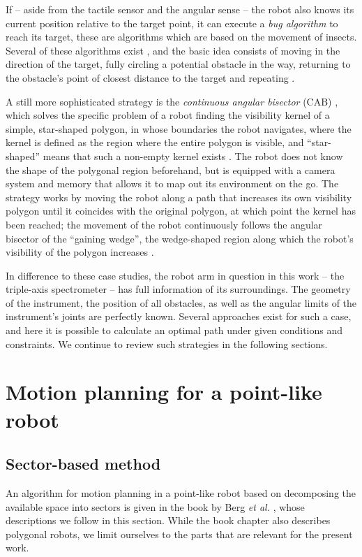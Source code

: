 If -- aside from the tactile sensor and the angular sense -- the robot also knows
its current position relative to the target point, it can execute a \textit{bug algorithm}
to reach its target, these are algorithms which are based on the movement of insects.
Several of these algorithms exist \cite{Choset2010_ch2}, and the basic idea consists
of moving in the direction of the target, fully circling a potential obstacle in the way,
returning to the obstacle's point of closest distance to the target and repeating
\cite[Ch. 7.3.1, pp. 323-326]{FUH_geo2020}.

A still more sophisticated strategy is the \textit{continuous angular bisector}
(CAB) \cite{Icking1995}, which solves the specific problem of a robot finding the visibility kernel
of a simple, star-shaped polygon, in whose boundaries the robot navigates, where the kernel is defined as the
region where the entire polygon is visible, and ``star-shaped'' means that such a
non-empty kernel exists \cite[Ch. 7.4.5, pp. 347-351]{FUH_geo2020}.
The robot does not know the shape of the polygonal region beforehand, but is equipped
with a camera system and memory that allows it to map out its environment on the go.
The strategy works by moving the robot along a path that increases its own visibility
polygon until it coincides with the original polygon, at which point the kernel has been
reached; the movement of the robot continuously follows the angular bisector of the
``gaining wedge'', the wedge-shaped region along which the robot's visibility of the
polygon increases \cite[p. 261]{Icking1995}.

In difference to these case studies, the robot arm in question in this work --
the triple-axis spectrometer -- has full information of its surroundings.
The geometry of the instrument, the position of all obstacles, as well
as the angular limits of the instrument's joints are perfectly known.
Several approaches exist for such a case, and here it is possible to calculate
an optimal path under given conditions and constraints.
We continue to review such strategies in the following sections.



\section{Motion planning for a point-like robot}
\label{sec:pointrobot}

\subsection{Sector-based method}
\label{sec:pointrobot_sector}
An algorithm for motion planning in a point-like robot based on decomposing the 
available space into sectors is given in the book by Berg \textit{et al.}
\cite[Ch. 13, pp. 283-306]{Berg2008}, whose descriptions we follow in this section. 
While the book chapter also describes polygonal robots, we limit ourselves to the 
parts that are relevant for the present work.

